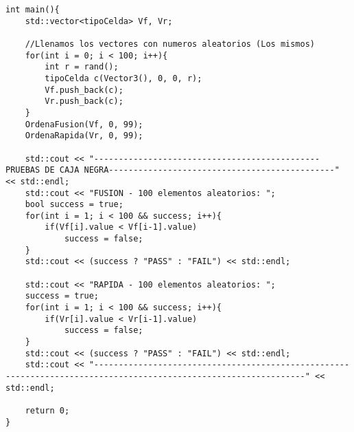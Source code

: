 \begin{lstlisting}
int main(){
    std::vector<tipoCelda> Vf, Vr;

    //Llenamos los vectores con numeros aleatorios (Los mismos)
    for(int i = 0; i < 100; i++){
        int r = rand();
        tipoCelda c(Vector3(), 0, 0, r);
        Vf.push_back(c);
        Vr.push_back(c);
    }
    OrdenaFusion(Vf, 0, 99);
    OrdenaRapida(Vr, 0, 99);

    std::cout << "----------------------------------------------PRUEBAS DE CAJA NEGRA----------------------------------------------" << std::endl;
    std::cout << "FUSION - 100 elementos aleatorios: ";
    bool success = true;
    for(int i = 1; i < 100 && success; i++){
        if(Vf[i].value < Vf[i-1].value)
            success = false;
    }
    std::cout << (success ? "PASS" : "FAIL") << std::endl;

    std::cout << "RAPIDA - 100 elementos aleatorios: ";
    success = true;
    for(int i = 1; i < 100 && success; i++){
        if(Vr[i].value < Vr[i-1].value)
            success = false;
    }
    std::cout << (success ? "PASS" : "FAIL") << std::endl;
    std::cout << "-----------------------------------------------------------------------------------------------------------------" << std::endl;

    return 0;
}
\end{lstlisting}
